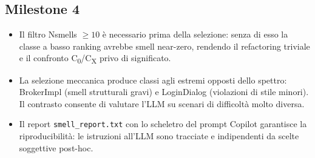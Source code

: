 \subsection{Milestone 4}

\begin{itemize}
    \item Il filtro Nsmells $\geq 10$ è necessario prima della selezione: senza di
    esso la classe a basso ranking avrebbe smell near-zero, rendendo il refactoring
    triviale e il confronto C\textsubscript{0}/C\textsubscript{X} privo di significato.

    \item La selezione meccanica produce classi agli estremi opposti dello spettro:
    BrokerImpl (smell strutturali gravi) e LoginDialog (violazioni di stile minori).
    Il contrasto consente di valutare l'LLM su scenari di difficoltà molto diversa.

    \item Il report \texttt{smell\_report.txt} con lo scheletro del prompt Copilot
    garantisce la riproducibilità: le istruzioni all'LLM sono tracciate e indipendenti
    da scelte soggettive post-hoc.
\end{itemize}

